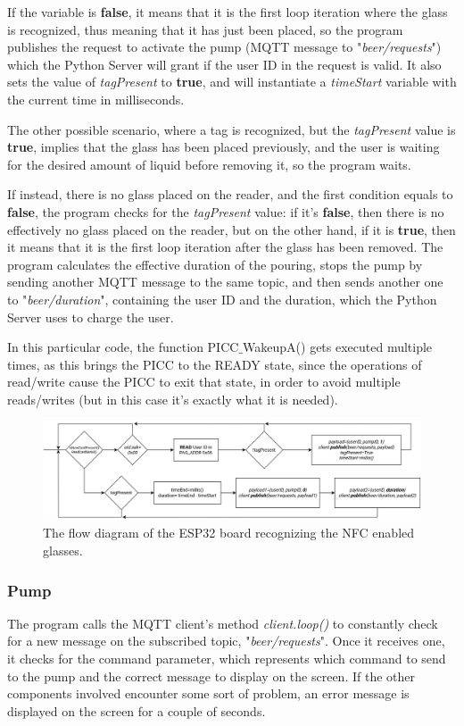\documentclass[target=bach,aauheader=,style=]{thud}
\begin{document}
If the variable is \textbf{false}, it means that it is the first loop iteration where the glass is recognized, thus meaning that it has just been placed, so the program publishes the request to activate the pump (MQTT message to "\emph{beer/requests}") which the Python Server will grant if the user ID in the request is valid. It also sets the value of \emph{tagPresent} to \textbf{true}, and will instantiate a \emph{timeStart} variable with the current time in milliseconds.

The other possible scenario, where a tag is recognized, but the \emph{tagPresent} value is \textbf{true}, implies that the glass has been placed previously, and the user is waiting for the desired amount of liquid before removing it, so the program waits.

If instead, there is no glass placed on the reader, and the first condition equals to \textbf{false}, the program checks for the \emph{tagPresent} value: if it's \textbf{false}, then there is no effectively no glass placed on the reader, but on the other hand, if it is \textbf{true}, then it means that it is the first loop iteration after the glass has been removed. The program calculates the effective duration of the pouring, stops the pump by sending another MQTT message to the same topic, and then sends another one to "\emph{beer/duration}", containing the user ID and the duration, which the Python Server uses to charge the user.

In this particular code, the function PICC$\_$WakeupA() gets executed multiple times, as this brings the PICC to the READY state, since the operations of read/write cause the PICC to exit that state, in order to avoid multiple reads/writes (but in this case it's exactly what it is needed).


\begin{figure}[h!]
	\centering
	\includegraphics[width=1.0\textwidth]{reader_flow}
	\caption{The flow diagram of the ESP32 board recognizing the NFC enabled glasses.}
	\label{fig:reader_flow}
\end{figure} 
\newpage
\subsubsection{Pump}
The program calls the MQTT client's method \emph{client.loop()} to constantly check for a new message on the subscribed topic, "\emph{beer/requests}". 
Once it receives one, it checks for the command parameter, which represents which command to send to the pump and the correct message to display on the screen. If the other components involved encounter some sort of problem, an error message is displayed on the screen for a couple of seconds.
\end{document}
